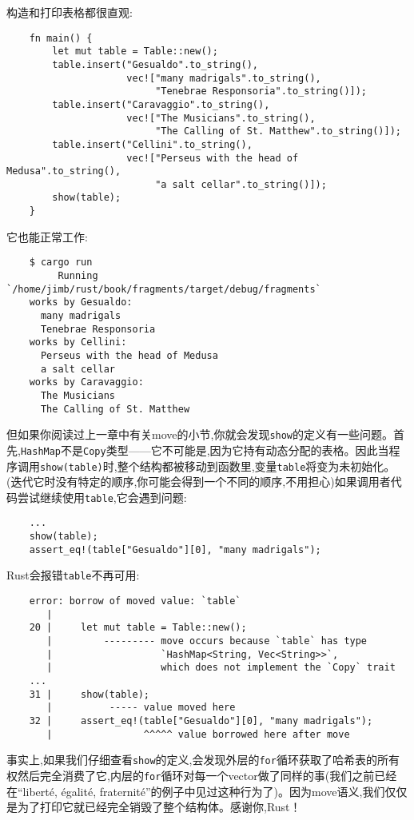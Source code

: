 构造和打印表格都很直观:
\begin{verbatim}
    fn main() {
        let mut table = Table::new();
        table.insert("Gesualdo".to_string(),
                     vec!["many madrigals".to_string(),
                          "Tenebrae Responsoria".to_string()]);
        table.insert("Caravaggio".to_string(),
                     vec!["The Musicians".to_string(),
                          "The Calling of St. Matthew".to_string()]);
        table.insert("Cellini".to_string(),
                     vec!["Perseus with the head of Medusa".to_string(),
                          "a salt cellar".to_string()]);
        show(table);
    }
\end{verbatim}

它也能正常工作:
\begin{verbatim}
    $ cargo run
         Running `/home/jimb/rust/book/fragments/target/debug/fragments`
    works by Gesualdo:
      many madrigals
      Tenebrae Responsoria
    works by Cellini:
      Perseus with the head of Medusa
      a salt cellar
    works by Caravaggio:
      The Musicians
      The Calling of St. Matthew
\end{verbatim}

但如果你阅读过上一章中有关move的小节,你就会发现\texttt{show}的定义有一些问题。首先,\texttt{HashMap}不是\texttt{Copy}类型——它不可能是,因为它持有动态分配的表格。因此当程序调用\texttt{show(table)}时,整个结构都被移动到函数里,变量\texttt{table}将变为未初始化。(迭代它时没有特定的顺序,你可能会得到一个不同的顺序,不用担心)如果调用者代码尝试继续使用\texttt{table},它会遇到问题:
\begin{verbatim}
    ...
    show(table);
    assert_eq!(table["Gesualdo"][0], "many madrigals");
\end{verbatim}

Rust会报错\texttt{table}不再可用:
\begin{verbatim}
    error: borrow of moved value: `table`
       |
    20 |     let mut table = Table::new();
       |         --------- move occurs because `table` has type
       |                   `HashMap<String, Vec<String>>`,
       |                   which does not implement the `Copy` trait
    ...
    31 |     show(table);
       |          ----- value moved here
    32 |     assert_eq!(table["Gesualdo"][0], "many madrigals");
       |                ^^^^^ value borrowed here after move
\end{verbatim}

事实上,如果我们仔细查看\texttt{show}的定义,会发现外层的\texttt{for}循环获取了哈希表的所有权然后完全消费了它,内层的\texttt{for}循环对每一个vector做了同样的事(我们之前已经在“liberté, égalité, fraternité”的例子中见过这种行为了)。因为move语义,我们仅仅是为了打印它就已经完全销毁了整个结构体。感谢你,Rust！

